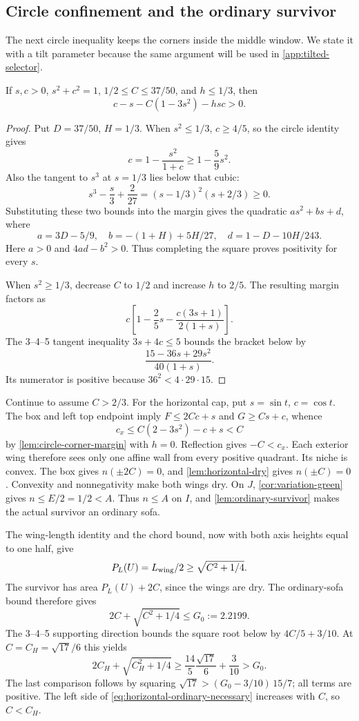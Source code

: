 \subsection{Circle confinement and the ordinary survivor}

The next circle inequality keeps the corners inside the middle
window. We state it with a tilt parameter because the same argument
will be used in \cref{app:tilted-selector}.

\begin{lemma}\label{lem:circle-corner-margin}
If $s,c>0$, $s^2+c^2=1$, $1/2\le C\le37/50$, and $h\le1/3$, then
\[
 c-s-C(1-3s^2)-hsc>0.
\]
\end{lemma}
\begin{proof}
Put $D=37/50$, $H=1/3$. When $s^2\le1/3$, $c\ge4/5$,
so the circle identity gives
\[
 c=1-\frac{s^2}{1+c}\ge1-\frac59s^2.
\]
Also the tangent to $s^3$ at $s=1/3$ lies below that cubic:
\[
 s^3-\frac s3+\frac2{27}
 =(s-1/3)^2(s+2/3)\ge0.
\]
Substituting these two bounds into the margin gives the quadratic
$a s^2+b s+d$, where
\[
 a=3D-5/9,\quad b=-(1+H)+5H/27,\quad d=1-D-10H/243.
\]
Here $a>0$ and $4ad-b^2>0$. Thus completing the square proves
positivity for every $s$.

When $s^2\ge1/3$, decrease $C$ to $1/2$ and increase $h$ to $2/5$.
The resulting margin factors as
\[
 c\left[1-\frac25s-\frac{c(3s+1)}{2(1+s)}\right].
\]
The 3--4--5 tangent inequality $3s+4c\le5$ bounds the bracket below by
\[
 \frac{15-36s+29s^2}{40(1+s)}.
\]
Its numerator is positive because $36^2<4\cdot29\cdot15$.
\end{proof}

Continue to assume $C>2/3$. For the horizontal cap, put $s=\sin t$, $c=\cos t$.
The box and left top endpoint imply
$F\le2Cc+s$ and $G\ge Cs+c$, whence
\[
 c_x\le C(2-3s^2)-c+s<C
\]
by \cref{lem:circle-corner-margin} with $h=0$.
Reflection gives $-C<c_x$. Each exterior wing therefore sees only
one affine wall from every positive quadrant. Its niche is convex.
The box gives $n(\pm2C)=0$, and \cref{lem:horizontal-dry} gives
$n(\pm C)=0$. Convexity and nonnegativity make both wings dry.
On $J$, \cref{cor:variation-green} gives $n\le E/2=1/2<A$.
Thus $n\le A$ on $I$, and \cref{lem:ordinary-survivor} makes the
actual survivor an ordinary sofa.

The wing-length identity and the chord bound, now with both axis
heights equal to one half, give
\[
 P_L(U)=L_{\rm wing}/2\ge\sqrt{C^2+1/4}.
\]
The survivor has area $P_L(U)+2C$, since the wings are dry.
The ordinary-sofa bound therefore gives
\begin{equation}\label{eq:horizontal-ordinary-necessary}
 2C+\sqrt{C^2+1/4}\le G_0:=2.2199.
\end{equation}
The 3--4--5 supporting direction bounds the square root below by
$4C/5+3/10$. At $C=C_H=\sqrt{17}/6$ this yields
\[
 2C_H+\sqrt{C_H^2+1/4}
 \ge\frac{14}{5}\frac{\sqrt{17}}6+\frac3{10}>G_0.
\]
The last comparison follows by squaring
$\sqrt{17}>(G_0-3/10)\,15/7$; all terms are positive.
The left side of \eqref{eq:horizontal-ordinary-necessary} increases
with $C$, so $C<C_H$.

